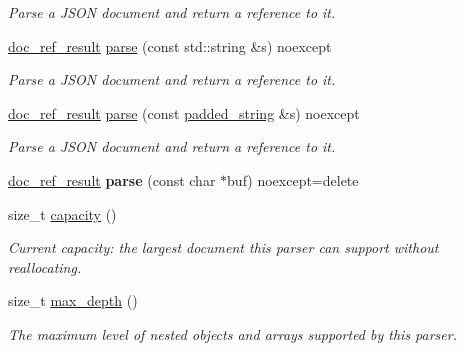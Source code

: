 \begin{DoxyCompactItemize}
\begin{DoxyCompactList}\small\item\em Parse a J\+S\+ON document and return a reference to it. \end{DoxyCompactList}\item 
\hyperlink{classsimdjson_1_1document_1_1doc__ref__result}{doc\+\_\+ref\+\_\+result} \hyperlink{classsimdjson_1_1document_1_1parser_ada490fbaf30ec3df5679b86e9b6914bd}{parse} (const std\+::string \&s) noexcept
\begin{DoxyCompactList}\small\item\em Parse a J\+S\+ON document and return a reference to it. \end{DoxyCompactList}\item 
\hyperlink{classsimdjson_1_1document_1_1doc__ref__result}{doc\+\_\+ref\+\_\+result} \hyperlink{classsimdjson_1_1document_1_1parser_a5c062f8ab3f45a5cb144056dde60b993}{parse} (const \hyperlink{structsimdjson_1_1padded__string}{padded\+\_\+string} \&s) noexcept
\begin{DoxyCompactList}\small\item\em Parse a J\+S\+ON document and return a reference to it. \end{DoxyCompactList}\item 
\mbox{\label{classsimdjson_1_1document_1_1parser_a505d0eecc82a63ffc60b6fd6a8765c48}} 
\hyperlink{classsimdjson_1_1document_1_1doc__ref__result}{doc\+\_\+ref\+\_\+result} {\bfseries parse} (const char $\ast$buf) noexcept=delete
\item 
\mbox{\label{classsimdjson_1_1document_1_1parser_af9ea6b75fa9c41c6633fdcf059744cb2}} 
size\+\_\+t \hyperlink{classsimdjson_1_1document_1_1parser_af9ea6b75fa9c41c6633fdcf059744cb2}{capacity} ()
\begin{DoxyCompactList}\small\item\em Current capacity\+: the largest document this parser can support without reallocating. \end{DoxyCompactList}\item 
\mbox{\label{classsimdjson_1_1document_1_1parser_ae3ccf7ff0c0aa18d6ba70d3e063461b7}} 
size\+\_\+t \hyperlink{classsimdjson_1_1document_1_1parser_ae3ccf7ff0c0aa18d6ba70d3e063461b7}{max\+\_\+depth} ()
\begin{DoxyCompactList}\small\item\em The maximum level of nested objects and arrays supported by this parser. \end{DoxyCompactList}\item 

\end{DoxyCompactItemize}
